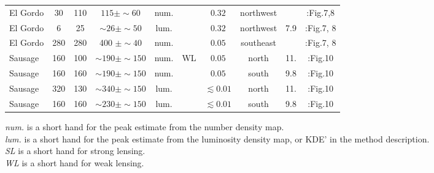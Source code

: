 \begin{table*}
\begin{tabular}{@{}lccccccccc@{}}
		El Gordo & 30 & 110 & $ 115 \pm \sim60$ & num. & & $0.32$ & 
		northwest&   &\citealt{Jee2014}:Fig.7,8  \\
		El Gordo & 6 & 25& $\sim26 \pm \sim50$ & lum. & & $0.32$ & northwest & 7.9   
		&\citealt{Jee2014}:Fig.7, 8  \\
		El Gordo & 280 & 280 & 400 $\pm \sim40$ & num. & & $0.05$ &
		southeast &   &\citealt{Jee2014}:Fig.7, 8  \\
		Sausage &160 & 100& $\sim190\pm \sim150$ & num. & WL & $
		0.05$ & north & 11.  &\citealt{Jee2015}:Fig.10\\ 
		Sausage &160 & 160& $ \sim190\pm \sim150 $  & num. &  & $
		0.05$ & south & 9.8 & \citealt{Jee2015}:Fig.10\\ 

		Sausage & 320 & 130 & $\sim340 \pm \sim150 $  & lum. & & $\lesssim
		0.01$ & north & 11. & \citealt{Jee2015}:Fig.10\\ 

		Sausage & 160 & 160 &$\sim230 \pm \sim150 $  & lum. & & $\lesssim
		0.01$ & south & 9.8 &\citealt{Jee2015}:Fig.10\\ 
	 \hline
	 \end{tabular} 
	 \raggedright{
		 {\it num.} is a short hand for the peak estimate from the number
		 density map. \\
		 {\it lum.} is a short hand for the peak estimate from the luminosity
		 density map, or KDE' in the method description. \\
		 {\it SL} is a short hand for strong lensing. \\
		 {\it WL} is a short hand for weak lensing. \\
	 }

\end{table*}

